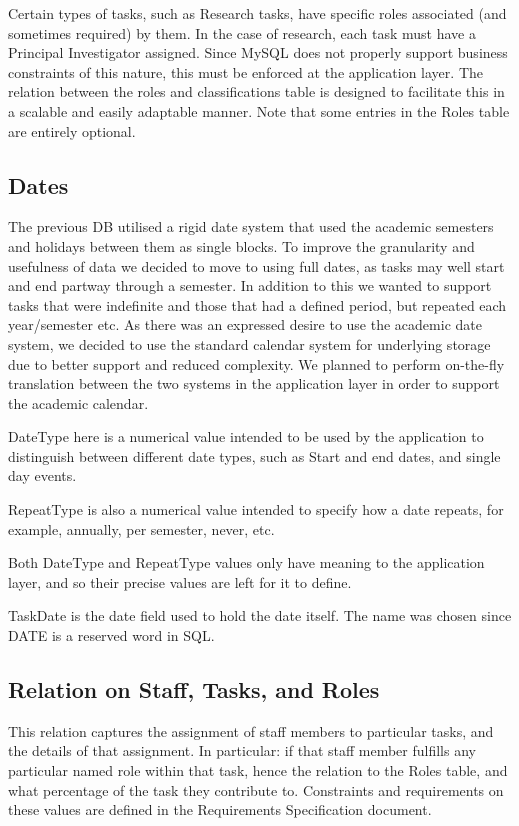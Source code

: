 \documentclass[11pt, a4paper]{article}
\begin{document}
Certain types of tasks, such as Research tasks, have specific roles associated (and sometimes required) by them. In the case of research, each task must have a Principal Investigator assigned. Since MySQL does not properly support business constraints of this nature, this must be enforced at the application layer. The relation between the roles and classifications table is designed to facilitate this in a scalable and easily adaptable manner. Note that some entries in the Roles table are entirely optional.

\subsection{Dates}
The previous DB utilised a rigid date system that used the academic semesters and holidays between them as single blocks. To improve the granularity and usefulness of data we decided to move to using full dates, as tasks may well start and end partway through a semester. In addition to this we wanted to support tasks that were indefinite and those that had a defined period, but repeated each year/semester etc. As there was an expressed desire to use the academic date system, we decided to use the standard calendar system for underlying storage due to better support and reduced complexity. We planned to perform on-the-fly translation between the two systems in the application layer in order to support the academic calendar.

DateType here is a numerical value intended to be used by the application to distinguish between different date types, such as Start and end dates, and single day events.

RepeatType is also a numerical value intended to specify how a date repeats, for example, annually, per semester, never, etc.

Both DateType and RepeatType values only have meaning to the application layer, and so their precise values are left for it to define.

TaskDate is the date field used to hold the date itself. The name was chosen since DATE is a reserved word in SQL.

\subsection{Relation on Staff, Tasks, and Roles}

This relation captures the assignment of staff members to particular tasks, and the details of that assignment. In particular: if that staff member fulfills any particular named role within that task, hence the relation to the Roles table, and what percentage of the task they contribute to. Constraints and requirements on these values are defined in the Requirements Specification document.
\end{document}
